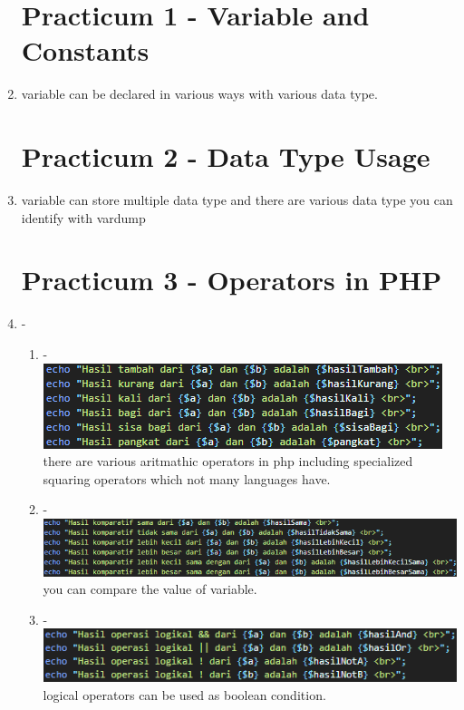 \documentclass[12pt,titlepage]{article}
\begin{document}
\begin{enumerate}[label*=\arabic*.]
    \section*{Practicum 1  - Variable and Constants}
    \item variable can be declared in various ways with various data type.
    \section*{Practicum 2  - Data Type Usage}
    \item variable can store multiple data type and there are various data type you can identify with var\textunderscore dump
    \section*{Practicum 3  - Operators in PHP}
    \item -
    \begin{enumerate}[label*=\arabic*.]
        \item - \\ \includegraphics[width=.8\textwidth]{images/figures/fig1.png} \\ there are various aritmathic operators in php including specialized squaring operators which not many languages have. 
        \item - \\ \includegraphics[width=.8\textwidth]{images/figures/fig2.png} \\ you can compare the value of variable.
        \item - \\ \includegraphics[width=.8\textwidth]{images/figures/fig3.png} \\ logical operators can be used as boolean condition.

\end{enumerate}
\end{enumerate}
\end{document}
